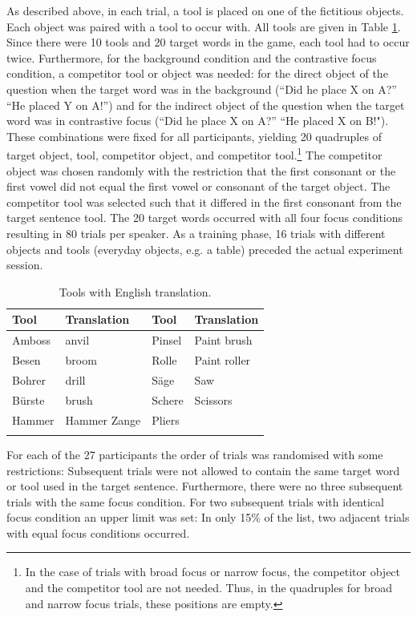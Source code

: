 As described above, in each trial, a tool is placed on one of the fictitious objects. Each object was paired with a tool to occur with. All tools are given in Table \ref{tab:tools}. Since there were 10 tools and 20 target words in the game, each tool had to occur twice. Furthermore, for the background condition and the contrastive focus condition, a competitor tool or object was needed: for the direct object of the question when the target word was in the background (``Did he place X on A?” “He placed Y on A!”) and for the indirect object of the question when the target word was in contrastive focus (``Did he place X on A?” “He placed X on B!"). These combinations were fixed for all participants, yielding 20 quadruples of target object, tool, competitor object, and competitor tool.\footnote{In the case of trials with broad focus or narrow focus, the competitor object and the competitor tool are not needed. Thus, in the quadruples for broad and narrow focus trials, these positions are empty.} The competitor object was chosen randomly with the restriction that the first consonant or the first vowel did not equal the first vowel or consonant of the target object. The competitor tool was selected such that it differed in the first consonant from the target sentence tool. The 20 target words occurred with all four focus conditions resulting in 80 trials per speaker. As a training phase, 16 trials with different objects and tools (everyday objects, e.g. a table) preceded the actual experiment session. 

\begin{table}
\caption{Tools with English translation.}
\begin{tabularx}{\textwidth}{XlXl}
	\lsptoprule
\textbf{Tool} & \textbf{Translation} & \textbf{Tool} & \textbf{Translation} \\
\hline
Amboss & anvil & Pinsel & Paint brush \\
Besen & broom & Rolle & Paint roller \\ 
Bohrer & drill & Säge & Saw \\
Bürste & brush & Schere & Scissors \\
Hammer & Hammer Zange & Pliers\\
 \lspbottomrule
\end{tabularx}
\label{tab:tools}
\end{table}

For each of the 27 participants the order of trials was randomised with some restrictions: Subsequent trials were not allowed to contain the same target word or tool used in the target sentence. Furthermore, there were no three subsequent trials with the same focus condition. For two subsequent trials with identical focus condition an upper limit was set: In only 15\% of the list, two adjacent trials with equal focus conditions occurred.

